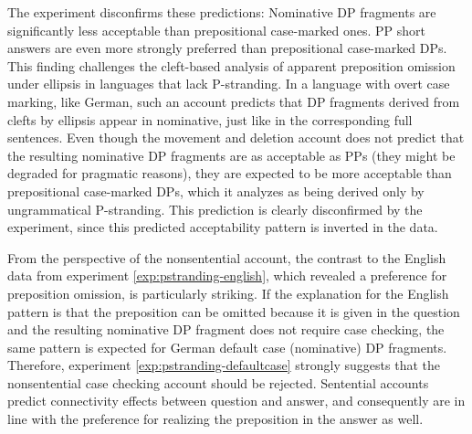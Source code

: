 The experiment disconfirms these predictions: Nominative DP fragments are significantly less acceptable than prepositional case-marked ones. PP short answers are even more strongly preferred than prepositional case-marked DPs. This finding challenges the cleft-based analysis of apparent preposition omission under ellipsis in languages that lack P-stranding. In a language with overt case marking, like German, such an account predicts that DP fragments derived from clefts by ellipsis appear in nominative, just like in the corresponding full sentences. Even though the movement and deletion account does not predict that the resulting nominative DP fragments are as acceptable as PPs (they might be degraded for pragmatic reasons), they are expected to be more acceptable than prepositional case-marked DPs, which it analyzes as being derived only by ungrammatical P-stranding. This prediction is clearly disconfirmed by the experiment, since this predicted acceptability pattern is inverted in the data.

\largerpage
From the perspective of the nonsentential account, the contrast to the English data from experiment \ref{exp:pstranding-english}, which revealed a preference for preposition omission, is particularly striking. If the explanation for the English pattern is that the preposition can be omitted because it is given in the question and the resulting nominative DP fragment does not require case checking, the same pattern is expected for German default case (nominative) DP fragments. Therefore, experiment \ref{exp:pstranding-defaultcase} strongly suggests that the nonsentential case checking account should be rejected. Sentential accounts predict connectivity effects between question and answer, and consequently are in line with the preference for realizing the preposition in the answer as well. 

